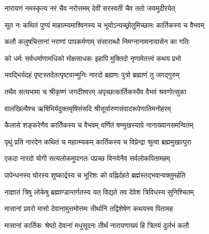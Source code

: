 \begingroup
\centering
\newcommand{\iti}[3]{\addtocounter{totalshlokas}{\value{shlokacount}}
{\centerline{\normalsize आदितः श्लोकाः — \devanumber{\value{totalshlokas}}}
॥इति श्रीस्कान्दे महापुराण एकाशीतिसाहस्र्यां संहितायां\\ द्वितीये वैष्णवखण्डे कार्तिकमासमाहात्म्ये\\#1\\ #2॥#3॥

\closesub
}
}


\twolineshloka
{नारायणं नमस्कृत्य नरं चैव नरोत्तमम्}
{देवीं सरस्वतीं चैव ततो जयमुदीरयेत्} %


\twolineshloka
{सूत नः कथितं पुण्यं माहात्म्यमाश्विनस्य च}
{भूयोऽन्यच्छ्रोतुमिच्छामः कार्तिकस्य च वैभवम्} %

\twolineshloka
{कलौ कलुषचित्तानां नराणां पापकर्मणाम्}
{संसाराब्धौ निमग्नानामनायासेन का गतिः} %

\twolineshloka
{को धर्मः सर्वधर्माणामधिको मोक्षसाधकः}
{इहापि मुक्तिदो नृणामेतत्त्वं कथय प्रभो} %


\twolineshloka
{भवद्भिर्यदहं पृष्टस्तदेतत्पृष्टवान्मुनिः}
{नारदो ब्रह्मणः पुत्रो ब्रह्माणं तु जगद्गुरुम्} %

\twolineshloka
{तथैव सत्यभामा च श्रीकृष्णं जगदीश्वरम्}
{अपृच्छत्कार्तिकस्यैव वैभवं श्रवणोत्सुका} %

\twolineshloka
{वालखिल्यैश्च ऋषिभिर्यदुक्तमृषिसंसदि}
{श्रीसूर्यारुणसंवादरूपेणातिमनोहरम्} %

\twolineshloka
{कैलासे शङ्करेणैव कार्तिकस्य च वैभवम्}
{वर्णितं षण्मुखस्याग्रे नानाख्यानसमन्वितम्} %

\twolineshloka
{पृथुं प्रति नारदेन कथितं च महात्म्यकम्}
{कार्तिकस्य च विप्रेन्द्रा श्रुत्वा ब्रह्ममुखात्पुरा} %

\twolineshloka
{एकदा नारदो योगी सत्यलोकमुपागतः}
{पप्रच्छ विनयेनैव सर्वलोकपितामहम्} %


\twolineshloka
{पापेन्धनस्य घोरस्य शुष्कार्द्रस्य च भूरिशः}
{को वह्निर्दहते ब्रह्मंस्तद्भवान्वक्तुमर्हति} %

\twolineshloka
{नाज्ञातं त्रिषु लोकेषु ब्रह्माण्डान्तर्गतस्य यत्}
{विद्यते तव देवेश त्रिविधस्य सुनिश्चितम्} %

\twolineshloka
{मासानां प्रवरो मासो देवानामुत्तमोत्तमः}
{तीर्थानि तद्विशेषेण कथयस्व पितामह} %


\twolineshloka
{मासानां कार्तिकः श्रेष्ठो देवानां मधुसूदनः}
{तीर्थं नारायणाख्यं हि त्रितयं दुर्लभं कलौ} %



